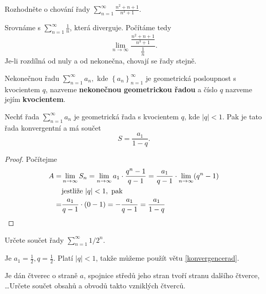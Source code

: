 \begin{priklad}
Rozhodněte o chování řady $\sum_{n=1}^\infty \frac{n^2+n+1}{n^3+1}$.
\end{priklad}

\begin{reseni}
Srovnáme s $\sum_{n=1}^\infty \frac{1}{n}$, která diverguje. Počítáme tedy
$$
\lim_{n\to\infty}\frac{\frac{n^2+n+1}{n^3+1}}{\frac{1}{n}}.
$$
Je-li rozdílná od nuly a od nekonečna, chovají se řady stejně.
\end{reseni}

\begin{definition}
Nekonečnou řadu $\sum_{n=1}^\infty a_n,$ kde $\left \{ a_n \right \}_{n=1}^\infty $
je geometrická posloupnost s kvocientem $q$, nazveme \textbf{nekonečnou geometrickou
řadou} a číslo $q$ nazveme jejím \textbf{kvocientem}.
\end{definition}

\begin{veta}\label{konvergencerad}
    Nechť řada $\sum_{n=1}^\infty a_n$ je geometrická řada s kvocientem $q$, kde
    $|q|<1.$ Pak je tato řada konvergentní a má součet
    $$S=\frac{a_1}{1-q}.$$
\end{veta}

\begin{proof}
Počítejme
\begin{align*}
    A =&\lim_{n\to\infty} S_n = \lim_{n\to\infty}a_1\cdot \frac{q^n - 1}{q-1}=\frac{a_1}{q-1}\cdot \lim_{n\to\infty}(q^n-1)\\
    & \textrm{jestliže } |q|<1, \textrm{ pak} \\
    = & \frac{a_1}{q-1}\cdot (0-1)=-\frac{a_1}{q-1}=\frac{a_1}{1-q}\qedhere
\end{align*}
\end{proof}


\begin{priklad}
Určete součet řady $\sum_{n=1}^\infty 1/2^n.$
\end{priklad}

\begin{reseni}
Je $a_1=\frac{1}{2},q=\frac{1}{2}$. Platí $|q|<1$, takže můžeme použít větu
\ref{konvergencerad}.
\end{reseni}

\begin{priklad}
Je dán čtverec o straně $a$, spojnice středů jeho stran tvoří stranu dalšího čtverce,
\dots Určete součet obsahů a obvodů takto vzniklých čtverců.
\end{priklad}
